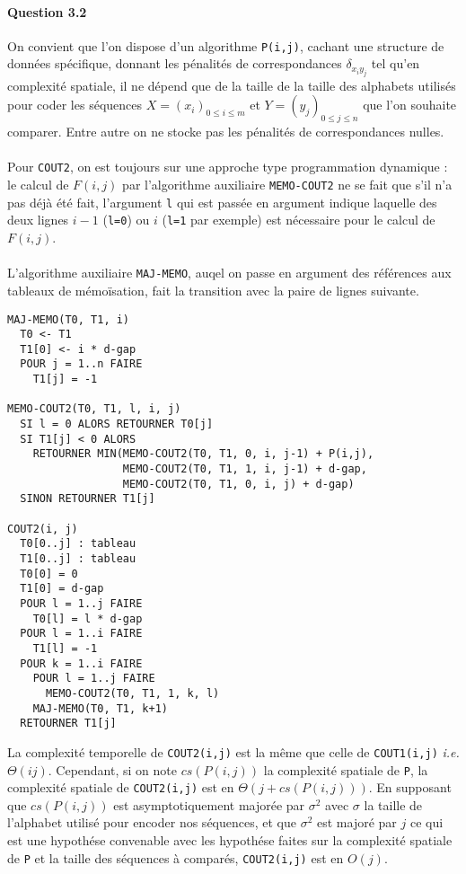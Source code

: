 \paragraph{Question 3.2}
On convient que l'on dispose d'un algorithme \verb'P(i,j)', cachant
une structure de donn\'ees sp\'ecifique, donnant les p\'enalit\'es de
correspondances $\delta_{x_iy_j}$ tel qu'en complexit\'e spatiale, il
ne d\'epend que de la taille de la taille des alphabets utilis\'es
pour coder les s\'equences $X=(x_i)_{0\leq i\leq m}$ et
$Y=(y_j)_{0\leq j\leq n}$ que l'on souhaite comparer. Entre autre on
ne stocke pas les p\'enalit\'es de correspondances nulles.\\\\
Pour \verb'COUT2', on est toujours sur une approche type programmation
dynamique : le calcul de $F(i,j)$ par l'algorithme auxiliaire
\verb'MEMO-COUT2' ne se fait que s'il n'a pas d\'ej\`a \'et\'e fait,
l'argument \verb'l' qui est pass\'ee en argument indique laquelle des
deux lignes $i-1$ (\verb'l=0') ou $i$ (\verb'l=1' par exemple) est
n\'ecessaire pour le calcul de $F(i,j)$.\\\\
L'algorithme auxiliaire \verb'MAJ-MEMO', auqel on passe en argument
des r\'ef\'erences aux tableaux de m\'emo\"isation, fait la transition
avec la paire de lignes suivante.
\begin{verbatim}
MAJ-MEMO(T0, T1, i)
  T0 <- T1
  T1[0] <- i * d-gap
  POUR j = 1..n FAIRE
    T1[j] = -1

MEMO-COUT2(T0, T1, l, i, j)
  SI l = 0 ALORS RETOURNER T0[j]
  SI T1[j] < 0 ALORS
    RETOURNER MIN(MEMO-COUT2(T0, T1, 0, i, j-1) + P(i,j),
                  MEMO-COUT2(T0, T1, 1, i, j-1) + d-gap,
                  MEMO-COUT2(T0, T1, 0, i, j) + d-gap)
  SINON RETOURNER T1[j]

COUT2(i, j)
  T0[0..j] : tableau
  T1[0..j] : tableau
  T0[0] = 0
  T1[0] = d-gap
  POUR l = 1..j FAIRE
    T0[l] = l * d-gap
  POUR l = 1..i FAIRE
    T1[l] = -1
  POUR k = 1..i FAIRE
    POUR l = 1..j FAIRE
      MEMO-COUT2(T0, T1, 1, k, l)
    MAJ-MEMO(T0, T1, k+1)
  RETOURNER T1[j]
\end{verbatim}
La complexit\'e temporelle de \verb'COUT2(i,j)' est la m\^eme que
celle de \verb'COUT1(i,j)' \emph{i.e.} $\Theta(ij)$. Cependant, si on
note $cs(P(i,j))$ la complexit\'e spatiale de \verb'P', la
complexit\'e spatiale de \verb'COUT2(i,j)' est en
$\Theta(j+cs(P(i,j)))$. En supposant que $cs(P(i,j))$ est
asymptotiquement major\'ee par $\sigma^2$ avec $\sigma$ la taille de
l'alphabet utilis\'e pour encoder nos s\'equences, et que $\sigma^2$
est major\'e par $j$ ce qui est une hypoth\'ese convenable avec les
hypoth\'ese faites sur la complexit\'e spatiale de \verb'P' et la
taille des s\'equences \`a compar\'es, \verb'COUT2(i,j)' est en $O(j)$.

